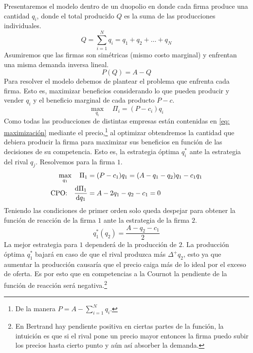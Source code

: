 Presentaremos el modelo dentro de un duopolio en donde cada firma produce una cantidad $q_i$, donde el total producido $Q$ es la suma de las producciones individuales.
\begin{equation}
    Q = \sum_{i=1}^N q_i = q_1 + q_2 + \ldots +q_N
\end{equation}
Asumiremos que las firmas son simétricas (mismo costo marginal) y enfrentan una misma demanda inversa lineal.
\begin{equation}
    P(Q) = A - Q \label{eq: demanda inversa lineal}
\end{equation}
Para resolver el modelo debemos de plantear el problema que enfrenta cada firma. Esto es, maximizar beneficios considerando lo que pueden producir y vender $q_i$ y el beneficio marginal de cada producto $P-c$.
\begin{equation}
    \max_{q_i} \quad \Pi _i = (P-c_i)q_i \label{eq: maximización}
\end{equation}
Como todas las producciones de distintas empresas están contenidas en \ref{eq: maximización} mediante el precio,\footnote{De la manera $P = A-\sum_{i = 1}^Nq_i$.} al optimizar obtendremos la cantidad que debiera producir la firma para maximizar sus beneficios en función de las decisiones de su competencia. Esto es, la estrategia óptima $q_i^*$ ante la estrategia del rival $q_j$. Resolvemos para la firma $1$.
\begin{align*}
\max_{q_1} \quad \Pi_1 &= (P-c_1)q_1 = (A-q_1-q_2)q_1 - c_1q_1 \\
 \text{CPO:} \quad \dv{\Pi_1}{q_1} &= A-2q_1 - q_2 -c_1 =0
\end{align*}
Teniendo las condiciones de primer orden solo queda despejar para obtener la función de reacción de la firma $1$ ante la estrategia de la firma $2$.
\begin{equation}
    q^*_1(q_2) = \frac{A-q_2-c_1}{2} \label{eq: Función de reacción 1}
\end{equation}
La mejor estrategia para $1$ dependerá de la producción de $2$. La producción óptima $q^*_1$ bajará en caso de que el rival produzca más $\Delta^+ q_2$, esto ya que aumentar la producción causaría que el precio caiga más de lo ideal por el exceso de oferta. Es por esto que en competencias a la Cournot la pendiente de la función de reacción será negativa.\footnote{En Bertrand hay pendiente positiva en ciertas partes de la función, la intuición es que si el rival pone un precio mayor entonces la firma puedo subir los precios hasta cierto punto y aún así absorber la demanda.}

